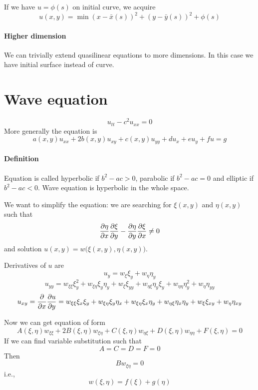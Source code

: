 If we have $u=\phi(s)$ on initial curve, we acquire
$$u(x,y) = \min (x-\bar{x}(s))^2 + (y-\bar{y}(s))^2 + \phi(s)$$

\paragraph{Higher dimension}
We can trivially extend quasilinear equations to more dimensions. In this case we have initial surface instead of curve.
\section{Wave equation}
$$u_{tt} -c^2u_{xx} = 0$$
More generally the equation is
$$a(x,y) u_{xx} + 2b(x,y) u_{xy} + c(x,y) u_{yy} + du_x + eu_y + fu = g$$

\paragraph{Definition}
Equation is called hyperbolic if $b^2-ac>0$, parabolic if  $b^2-ac=0$ and elliptic if  $b^2-ac<0$. Wave equation is hyperbolic in the whole space.

We want to simplify the equation: we are searching for $\xi(x,y)$ and $\eta(x,y)$ such that
$$\pdv{\eta}{x} \pdv{\xi}{y} - \pdv{\eta}{y} \pdv{\xi}{x} \neq 0$$
and solution $u(x,y) = w\big(\xi(x,y), \eta(x,y)\big)$.

Derivatives of $u$ are
$$u_y = w_\xi \xi_y + w_\eta \eta_y$$
$$u_{yy} = w_{\xi\xi} \xi_{y}^2 + w_{\xi\eta}\xi_y\eta_y + w_{\xi}\xi_{yy} + w_{\eta \xi}\eta_y\xi_y + w_{\eta\eta} \eta_{y}^2+ w_{\eta}\eta_{yy}  $$
$$u_{xy} =\pdv{x}\pdv{u}{y} = w_{\xi \xi} \xi_x\xi_y + w_{\xi\eta}\xi_y\eta_x + w_{\xi\eta}\xi_x\eta_y + w_{\eta \xi} \eta_x\eta_y + w_{\xi}\xi_{xy}+w_\eta\eta_{xy}$$

Now we can get equation of form
$$A(\xi,\eta) w_{\xi\xi} + 2B(\xi,\eta) w_{\xi\eta} + C(\xi,\eta) w_{\eta \xi} + D(\xi,\eta) w_{\eta\eta}+ F(\xi,\eta) = 0$$
If we can find variable substitution such that
$$A=C=D=F=0$$
Then
$$Bw_{\xi\eta} = 0$$
i.e.,
$$w(\xi,\eta) = f(\xi)+g(\eta)$$